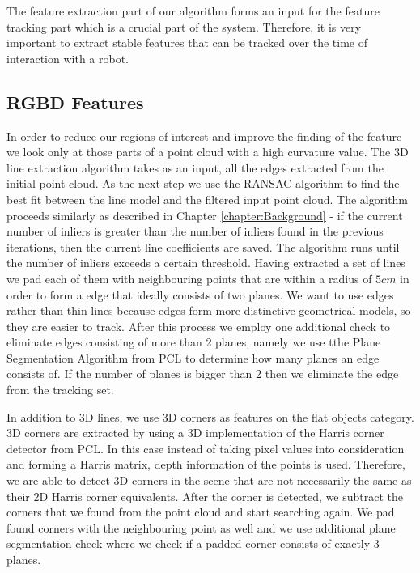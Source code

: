 The feature extraction part of our algorithm forms an input for the feature tracking part which is a crucial part of the system. Therefore, it is very important to extract stable features that can be tracked over the time of interaction with a robot.




\subsection{RGBD Features}
\label{sec:3dfeatures}
In order to reduce our regions of interest and improve the finding of the feature we look only at those parts of a point cloud with a high curvature value. The 3D line extraction algorithm takes as an input, all the edges extracted from the initial point cloud. As the next step we use the RANSAC algorithm to find the best fit between the line model and the filtered input point cloud. The algorithm proceeds similarly as described in Chapter \ref{chapter:Background} - if the current number of inliers is greater than the number of inliers found in the previous iterations, then the current line coefficients are saved. The algorithm runs until the number of inliers exceeds a certain threshold. Having extracted a set of lines we pad each of them with neighbouring points that are within a radius of $5cm$ in order to form a edge that ideally consists of two planes. We want to use edges rather than thin lines because edges form more distinctive geometrical models, so they are easier to track. After this process we employ one additional check to eliminate edges consisting of more than 2 planes, namely we use tthe Plane Segmentation Algorithm from PCL to determine how many planes an edge consists of. If the number of planes is bigger than 2 then we eliminate the edge from the tracking set.

In addition to 3D lines, we use 3D corners as features on the flat objects category. 3D corners are extracted by using a 3D implementation of the Harris corner detector from PCL. In this case instead of taking pixel values into consideration and forming a Harris matrix, depth information of the points is used. Therefore, we are able to detect 3D corners in the scene that are not necessarily the same as their 2D Harris corner equivalents. After the corner is detected, we subtract the corners that we found from the point cloud and start searching again. We pad found corners with the neighbouring point as well and we use additional plane segmentation check where we check if a padded corner consists of exactly 3 planes.

